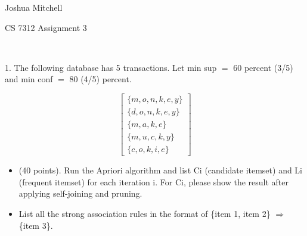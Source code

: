 \documentclass[12pt]{article}
\newcommand{\mt}[1]{\ensuremath{#1}}
\newcommand{\rar}{ \mt{\Rightarrow} }     %
\newcommand{\bk}[1]{\{#1\}}
\newcommand{\eql}{\mt{=} }
\begin{document}
Joshua Mitchell

CS 7312 Assignment 3

\

1. The following database has 5 transactions. Let min sup \eql 60 percent (3/5) and min conf \eql 80 (4/5) percent. 

\begin{displaymath}
  \begin{bmatrix}
     \bk{m, o, n, k, e, y}  \\
     \bk{d, o, n, k, e, y} \\
     \bk{m, a, k, e} \\
     \bk{m, u, c, k, y}\\
     \bk{c, o, k, i, e} 
\end{bmatrix}
\end{displaymath}

\begin{itemize}
  \item (40 points). Run the Apriori algorithm and list Ci (candidate itemset) and Li (frequent itemset) for each iteration i. For Ci, please show the result after applying self-joining and pruning.
  
  \item List all the strong association rules in the format of \bk{item 1, item 2} \rar \bk{item 3}.
  
\end{itemize}
\end{document}
